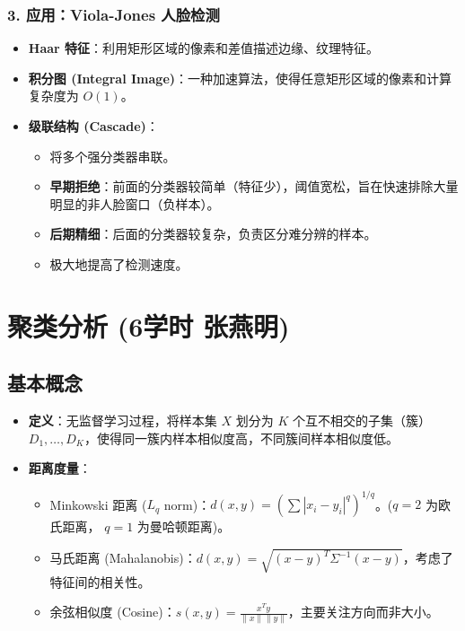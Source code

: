 \documentclass[a4paper, 11pt]{ctexart}
\begin{document}
\subsubsection{3. 应用：Viola-Jones 人脸检测}
\begin{itemize}
    \item \textbf{Haar 特征}：利用矩形区域的像素和差值描述边缘、纹理特征。
    \item \textbf{积分图 (Integral Image)}：一种加速算法，使得任意矩形区域的像素和计算复杂度为 $O(1)$。
    \item \textbf{级联结构 (Cascade)}：
    \begin{itemize}
        \item 将多个强分类器串联。
        \item \textbf{早期拒绝}：前面的分类器较简单（特征少），阈值宽松，旨在快速排除大量明显的非人脸窗口（负样本）。
        \item \textbf{后期精细}：后面的分类器较复杂，负责区分难分辨的样本。
        \item 极大地提高了检测速度。
    \end{itemize}
\end{itemize}

\newpage
\section{聚类分析 \small{(6学时 张燕明)}}

\subsection{基本概念}
\begin{itemize}
    \item \textbf{定义}：无监督学习过程，将样本集 $X$ 划分为 $K$ 个互不相交的子集（簇）$D_1, \dots, D_K$，使得同一簇内样本相似度高，不同簇间样本相似度低。
    \item \textbf{距离度量}：
    \begin{itemize}
        \item Minkowski 距离 ($L_q$ norm)：$d(x,y) = (\sum |x_i - y_i|^q)^{1/q}$。($q=2$ 为欧氏距离， $q=1$ 为曼哈顿距离)。
        \item 马氏距离 (Mahalanobis)：$d(x,y) = \sqrt{(x-y)^T \Sigma^{-1} (x-y)}$，考虑了特征间的相关性。
        \item 余弦相似度 (Cosine)：$s(x,y) = \frac{x^T y}{\|x\| \|y\|}$，主要关注方向而非大小。
    \end{itemize}
\end{itemize}
\end{document}
